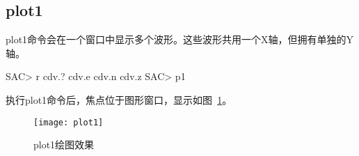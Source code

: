 \subsection{plot1}
plot1命令会在一个窗口中显示多个波形。这些波形共用一个X轴，但拥有单独的Y轴。
\begin{SACCode}
SAC> r cdv.?
cdv.e cdv.n cdv.z
SAC> p1
\end{SACCode}
执行plot1命令后，焦点位于图形窗口，显示如图~\ref{fig:plot1}。
\begin{figure}[H]
\centering
\texttt{[image: plot1]}
\caption{plot1绘图效果}
\label{fig:plot1}
\end{figure}
